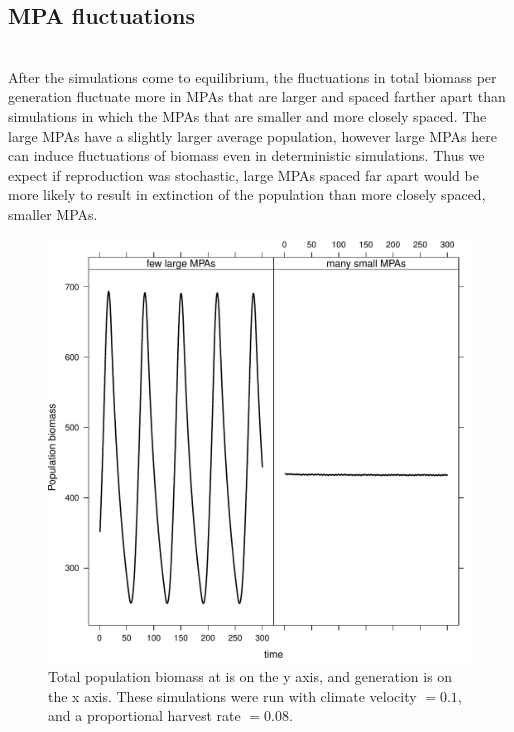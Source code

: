 \documentclass[12pt,english]{article}
\begin{document}
\subsection{MPA fluctuations \label{MPA}}
~\\After the simulations come to equilibrium, the fluctuations in total biomass per generation fluctuate more in MPAs that are larger and spaced farther apart than simulations in which the MPAs that are smaller and more closely spaced. The large MPAs have a slightly larger average population, however large MPAs here can induce fluctuations of biomass even in deterministic simulations. Thus we expect if reproduction was stochastic, large MPAs spaced far apart would be more likely to result in extinction of the population than more closely spaced, smaller MPAs. 
\begin{figure}[h]
\includegraphics[width=.85\textwidth]{plots/bounded_flux.pdf}
\caption{Total population biomass at is on the y axis, and generation is on the x axis. These simulations were run with climate velocity $ = 0.1$, and a proportional harvest rate $= 0.08$. }
\end{figure}

\pagebreak

\end{document}
